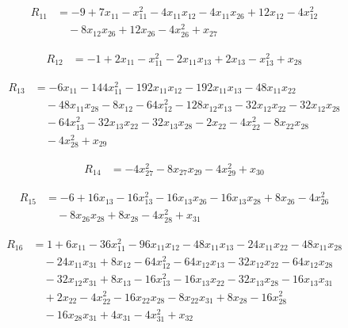\begin{align*}
R_{11} &= -9 +7 x_{11} -x_{11}^{2} -4 x_{11} x_{12} -4 x_{11} x_{26} +12 x_{12} -4 x_{12}^{2} \\
&\quad -8 x_{12} x_{26} +12 x_{26} -4 x_{26}^{2} +x_{27}
\end{align*}

\begin{align*}
R_{12} &= -1 +2 x_{11} -x_{11}^{2} -2 x_{11} x_{13} +2 x_{13} -x_{13}^{2} +x_{28}
\end{align*}

\begin{align*}
R_{13} &= -6 x_{11} -144 x_{11}^{2} -192 x_{11} x_{12} -192 x_{11} x_{13} -48 x_{11} x_{22} \\
&\quad -48 x_{11} x_{28} -8 x_{12} -64 x_{12}^{2} -128 x_{12} x_{13} -32 x_{12} x_{22} -32 x_{12} x_{28} \\
&\quad -64 x_{13}^{2} -32 x_{13} x_{22} -32 x_{13} x_{28} -2 x_{22} -4 x_{22}^{2} -8 x_{22} x_{28} \\
&\quad -4 x_{28}^{2} +x_{29}
\end{align*}

\begin{align*}
R_{14} &= -4 x_{27}^{2} -8 x_{27} x_{29} -4 x_{29}^{2} +x_{30}
\end{align*}

\begin{align*}
R_{15} &= -6 +16 x_{13} -16 x_{13}^{2} -16 x_{13} x_{26} -16 x_{13} x_{28} +8 x_{26} -4 x_{26}^{2} \\
&\quad -8 x_{26} x_{28} +8 x_{28} -4 x_{28}^{2} +x_{31}
\end{align*}

\begin{align*}
R_{16} &= 1 +6 x_{11} -36 x_{11}^{2} -96 x_{11} x_{12} -48 x_{11} x_{13} -24 x_{11} x_{22} -48 x_{11} x_{28} \\
&\quad -24 x_{11} x_{31} +8 x_{12} -64 x_{12}^{2} -64 x_{12} x_{13} -32 x_{12} x_{22} -64 x_{12} x_{28} \\
&\quad -32 x_{12} x_{31} +8 x_{13} -16 x_{13}^{2} -16 x_{13} x_{22} -32 x_{13} x_{28} -16 x_{13} x_{31} \\
&\quad +2 x_{22} -4 x_{22}^{2} -16 x_{22} x_{28} -8 x_{22} x_{31} +8 x_{28} -16 x_{28}^{2} \\
&\quad -16 x_{28} x_{31} +4 x_{31} -4 x_{31}^{2} +x_{32}
\end{align*}

